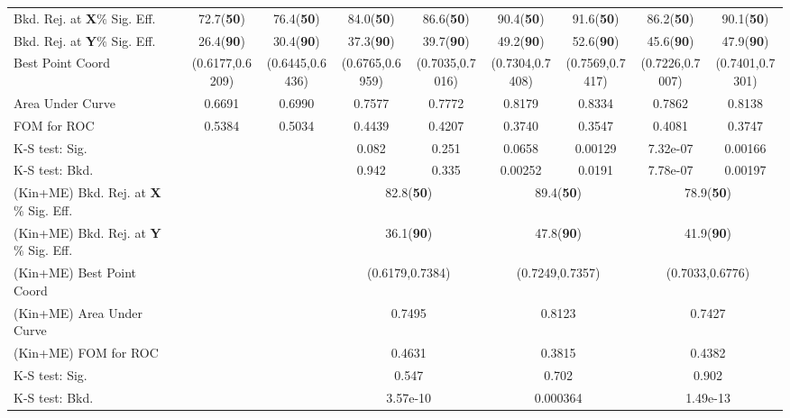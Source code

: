 {\begin{table}[ht!]
{\begin{tabular}{| l | c | c | c | c | c | c | c | c | c |}
Bkd. Rej. at \textbf{X}$\%$ Sig. Eff. && 72.7(\textbf{50}) & 76.4(\textbf{50}) & 84.0(\textbf{50}) & 86.6(\textbf{50}) & 90.4(\textbf{50}) & 91.6(\textbf{50}) & 86.2(\textbf{50}) & 90.1(\textbf{50}) \\
Bkd. Rej. at \textbf{Y}$\%$ Sig. Eff. && 26.4(\textbf{90}) & 30.4(\textbf{90}) & 37.3(\textbf{90}) & 39.7(\textbf{90}) & 49.2(\textbf{90}) & 52.6(\textbf{90}) & 45.6(\textbf{90}) & 47.9(\textbf{90}) \\
Best Point Coord && (0.6177,0.6209) & (0.6445,0.6436) & (0.6765,0.6959) & (0.7035,0.7016) & (0.7304,0.7408) & (0.7569,0.7417) & (0.7226,0.7007) & (0.7401,0.7301) \\
Area Under Curve && 0.6691 & 0.6990 & 0.7577 & 0.7772 & 0.8179 & 0.8334 & 0.7862 & 0.8138 \\
FOM for ROC & & 0.5384 & 0.5034 & \cellcolor{cyan}0.4439 & \cellcolor{green}0.4207 & 0.3740 & 0.3547 & 0.4081 & 0.3747 \\ \hline
K-S test: Sig. & & & & 0.082 & 0.251& 0.0658 & 0.00129 & 7.32e-07 & 0.00166 \\
K-S test: Bkd. & & & & 0.942 & 0.335 & 0.00252 & 0.0191 & 7.78e-07 & 0.00197 \\ \hline
(Kin+ME) Bkd. Rej. at \textbf{X}$\%$ Sig. Eff. &&&& \multicolumn{2}{c|}{82.8(\textbf{50})} & \multicolumn{2}{c|}{89.4(\textbf{50})} & \multicolumn{2}{c|}{78.9(\textbf{50})} \\
(Kin+ME) Bkd. Rej. at \textbf{Y}$\%$ Sig. Eff. &&&& \multicolumn{2}{c|}{36.1(\textbf{90})} & \multicolumn{2}{c|}{47.8(\textbf{90})} & \multicolumn{2}{c|}{41.9(\textbf{90})} \\
(Kin+ME) Best Point Coord &&&& \multicolumn{2}{c|}{(0.6179,0.7384)} & \multicolumn{2}{c|}{(0.7249,0.7357)} & \multicolumn{2}{c|}{(0.7033,0.6776)} \\
(Kin+ME) Area Under Curve &&&& \multicolumn{2}{c|}{0.7495} & \multicolumn{2}{c|}{0.8123} & \multicolumn{2}{c|}{0.7427} \\
(Kin+ME) FOM for ROC &&&& \multicolumn{2}{c|}{0.4631} & \multicolumn{2}{c|}{0.3815} & \multicolumn{2}{c|}{0.4382} \\ \hline
K-S test: Sig. &&&&  \multicolumn{2}{c|}{0.547} &  \multicolumn{2}{c|}{0.702} &  \multicolumn{2}{c|}{0.902} \\
K-S test: Bkd. &&&&  \multicolumn{2}{c|}{3.57e-10} &  \multicolumn{2}{c|}{0.000364} &  \multicolumn{2}{c|}{1.49e-13} \\ \hline
    \end{tabular} }
\end{table}
}
